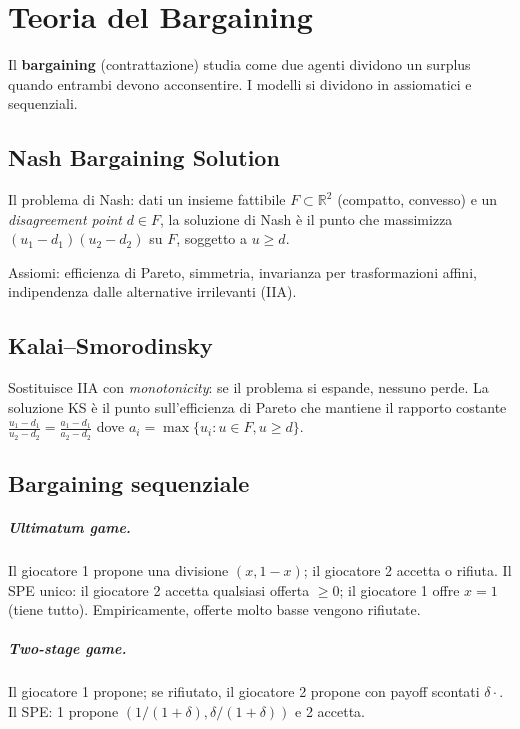 \documentclass[12pt,a4paper,twoside]{book}
\theoremstyle{plain}
\theoremstyle{definition}
\begin{document}
\appendix

\chapter{Teoria del Bargaining}
\label{app:bargaining}

Il \textbf{bargaining} (contrattazione) studia come due agenti dividono un surplus quando entrambi devono acconsentire. I modelli si dividono in assiomatici e sequenziali.

\section{Nash Bargaining Solution}

Il problema di Nash: dati un insieme fattibile $F\subset\mathbb{R}^2$ (compatto, convesso) e un \emph{disagreement point} $d\in F$, la soluzione di Nash è il punto che massimizza $(u_1-d_1)(u_2-d_2)$ su $F$, soggetto a $u\ge d$.

Assiomi: efficienza di Pareto, simmetria, invarianza per trasformazioni affini, indipendenza dalle alternative irrilevanti (IIA).

\section{Kalai--Smorodinsky}

Sostituisce IIA con \emph{monotonicity}: se il problema si espande, nessuno perde. La soluzione KS è il punto sull'efficienza di Pareto che mantiene il rapporto costante $\frac{u_1-d_1}{u_2-d_2}=\frac{a_1-d_1}{a_2-d_2}$ dove $a_i=\max\{u_i : u\in F, u\ge d\}$.

\section{Bargaining sequenziale}

\paragraph{Ultimatum game.} Il giocatore 1 propone una divisione $(x,1-x)$; il giocatore 2 accetta o rifiuta. Il SPE unico: il giocatore 2 accetta qualsiasi offerta $\ge 0$; il giocatore 1 offre $x=1$ (tiene tutto). Empiricamente, offerte molto basse vengono rifiutate.

\paragraph{Two-stage game.} Il giocatore 1 propone; se rifiutato, il giocatore 2 propone con payoff scontati $\delta\cdot$. Il SPE: 1 propone $(1/(1+\delta), \delta/(1+\delta))$ e 2 accetta.
\end{document}
